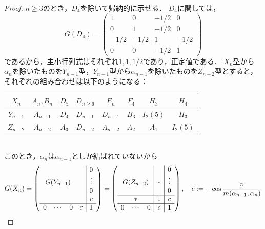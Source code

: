 \begin{proof}
  $n \ge 3$のとき，$D_4$を除いて帰納的に示せる．
  $D_4$に関しては，
  \begin{equation}
    G(D_4) = \begin{pmatrix}
      1 & 0 & -1/2 & 0 \\
      0 & 1 & -1/2 & 0 \\
      -1/2 & -1/2 & 1 & -1/2 \\
      0 & 0 & -1/2 & 1
    \end{pmatrix}
  \end{equation}
  であるから，主小行列式はそれぞれ$1, 1, 1/2$であり，正定値である．
  $X_n$型から$\alpha_n$を除いたものを$Y_{n-1}$型，$Y_{n-1}$型から$\alpha_{n-1}$を除いたものを$Z_{n-2}$型とすると，それぞれの組み合わせは以下のようになる：
  \begin{table}[htbp]
    \centering
    \begin{tabular}{c|ccccccc}
      $X_n$ & $A_n, B_n$ & $D_5$ & $D_{n \ge 6}$ & $E_n$ & $F_4$ & $H_3$ & $H_4$ \\ \hline
      $Y_{n-1}$ & $A_{n-1}$ & $D_4$ & $D_{n-1}$ & $D_{n-1}$ & $B_3$ & $I_2(5)$ & $H_3$ \\ \hline
      $Z_{n-2}$ & $A_{n-2}$ & $A_3$ & $D_{n-2}$ & $A_{n-2}$ & $A_2$ & $A_1$ & $I_2(5)$
    \end{tabular}
  \end{table}\\
  このとき，$\alpha_n$は$\alpha_{n-1}$としか結ばれていないから
  \begin{equation}
    G(X_n) = \left(
      \begin{array}{cccc|c}
        & & & & 0 \\
        \multicolumn{3}{c}{G(Y_{n-1})} & & \vdots \\
        & & & & 0 \\
        & & & & c \\ \hline
        0 & \cdots & 0 & c & 1
      \end{array}
    \right)
    = \left(
      \begin{array}{ccc|c|c}
        & & & & 0 \\
        \multicolumn{3}{c|}{G(Z_{n-2})} & * & \vdots \\
        & & & & 0 \\ \hline
        & * & & 1 & c \\ \hline
        0 & \cdots & 0 & c & 1
      \end{array}
    \right)
    ,\quad c := -\cos\frac{\pi}{m(\alpha_{n-1}, \alpha_n)}
  \end{equation}

\end{proof}
